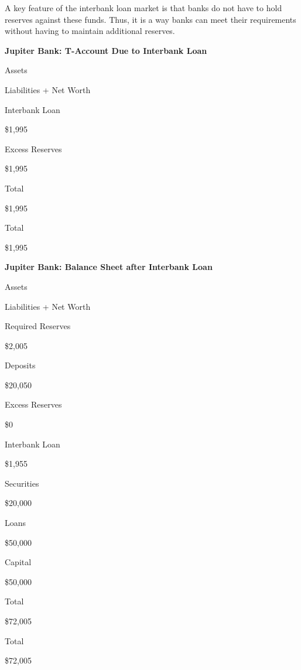 \documentclass[
]{book}
\begin{document}
A key feature of the interbank loan market is that banks do not have to hold reserves against these funds. Thus, it is a way banks can meet their requirements without having to maintain additional reserves.

\label{tab:t19}\textbf{Jupiter Bank: T-Account Due to Interbank Loan}

Assets

Liabilities + Net Worth

Interbank Loan

\$1,995

Excess Reserves

\$1,995

Total

\$1,995

Total

\$1,995

\label{tab:t20}\textbf{Jupiter Bank: Balance Sheet after Interbank Loan}

Assets

Liabilities + Net Worth

Required Reserves

\$2,005

Deposits

\$20,050

Excess Reserves

\$0

Interbank Loan

\$1,955

Securities

\$20,000

Loans

\$50,000

Capital

\$50,000

Total

\$72,005

Total

\$72,005
\end{document}
